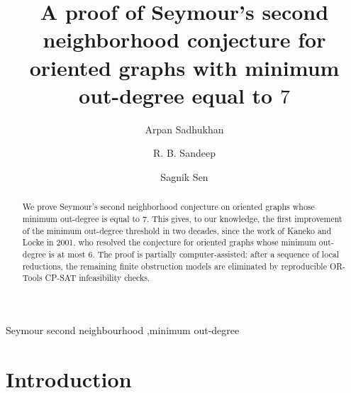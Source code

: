 \documentclass[a4paper,fleqn]{cas-sc}
\theoremstyle{definition}
\begin{document}
\let\WriteBookmarks\relax
\def\floatpagepagefraction{1}
\def\textpagefraction{.001}


\title[mode=title]{A proof of Seymour's second neighborhood conjecture for oriented graphs with minimum out-degree equal to \(7\)}


\author[1]{Arpan Sadhukhan}

\author[2]{R. B. Sandeep}

\author[1]{Sagnik Sen}






\begin{abstract}
We prove Seymour's second neighborhood conjecture on oriented graphs whose minimum out-degree is equal to $7$. This gives, to our knowledge, the first improvement of the minimum out-degree threshold in two decades, since the work of Kaneko and Locke in 2001, who resolved the conjecture for oriented graphs whose minimum out-degree is at most $6$. The proof is partially computer-assisted: after a sequence of local reductions, the remaining finite obstruction models are eliminated by reproducible OR-Tools CP-SAT infeasibility checks. %
\end{abstract}

\begin{keywords}
Seymour second neighbourhood \sep minimum out-degree  
\end{keywords}

\maketitle

\section{Introduction}
\end{document}
